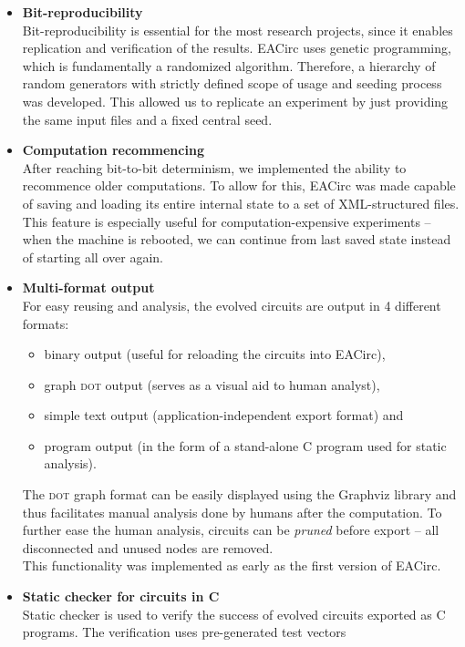 \documentclass[12pt,oneside]{fithesis2}		%
\renewcommand{\_}{\leavevmode \kern0.0em\vbox{\hrule width0.4em}}
\newcommand{\squarebullet}{\textcolor{black}{\raisebox{0.15em}{\rule{4pt}{4pt}}}}
\newenvironment{myItemize}{
  \begin{itemize}[leftmargin=2em,rightmargin=1em,itemsep=\parskip ,parsep=0em,topsep=0em,partopsep=0em]
  \renewcommand{\labelitemi}{\squarebullet}
  \renewcommand{\labelitemii}{$\diamond$}
}{
  \end{itemize}
}
\begin{document}
\begin{myItemize}
\item \textbf{Bit-reproducibility}\\
Bit-reproducibility is essential for the most research projects, since it enables replication and verification of the results.
EACirc uses genetic programming, which is fundamentally a randomized algorithm. Therefore, a hierarchy of random
generators with strictly defined scope of usage and seeding process was developed. This allowed us to replicate an experiment
by just providing the same input files and a fixed central seed.
\item \textbf{Computation recommencing}\\
After reaching bit-to-bit determinism, we implemented the ability to recommence older computations. 
To allow for this, EACirc was made capable of saving and loading its entire internal state to a set of XML-structured files.
This feature is especially useful for computation-expensive experiments -- when the machine is rebooted, we can continue from last saved state instead of starting all over again.
\item \textbf{Multi-format output}\\
For easy reusing and analysis, the evolved circuits are output in 4 different formats:
\begin{myItemize}
\item binary output (useful for reloading the circuits into EACirc),
\item graph \textsc{dot} output (serves as a visual aid to human analyst),
\item simple text output (application-independent export format) and
\item program output (in the form of a stand-alone C program used for static analysis).
\end{myItemize}
\noindent
The \textsc{dot} graph format can be easily displayed using the Graphviz library \parencite{graphviz} and thus 
facilitates manual analysis done by humans after the computation.
To further ease the human analysis, circuits can be \textit{pruned} before export -- all disconnected and unused nodes are removed.\\
This functionality was implemented as early as the first version of EACirc. 
\item \textbf{Static checker for circuits in C}\\
Static checker is used to verify the success of evolved circuits exported as C programs. 
The verification uses pre-generated test vectors

\end{myItemize}
\end{document}
